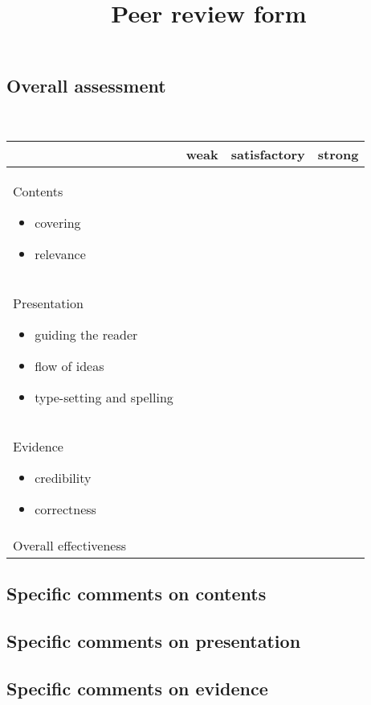\documentclass[11pt]{amsart}
\title{Peer review form}
\begin{document}
\maketitle


\subsection*{Overall assessment}
\ \bigskip


\begin{center}
  \begin{tabular}{|p{5cm}|c|c|c|} 
     \hline
     & weak & satisfactory & strong \\ \hline 
     Contents {\footnotesize \begin{itemize} \item covering \item relevance \end{itemize}} & & & \\ \hline 
     Presentation {\footnotesize \begin{itemize} \item guiding the reader \item flow of ideas \item type-setting and spelling \end{itemize}} & & & \\ \hline 
     Evidence {\footnotesize \begin{itemize} \item credibility \item correctness \end{itemize}} & & & \\ \hline 
     Overall effectiveness & & & \\ \hline 
  \end{tabular}
\end{center}

\subsection*{Specific comments on contents}


\subsection*{Specific comments on presentation}


\subsection*{Specific comments on evidence}

\end{document}
